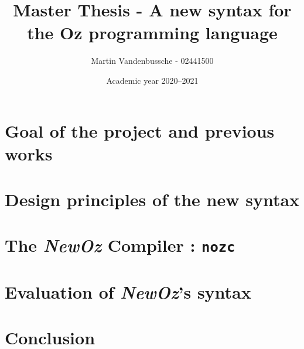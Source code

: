 \documentclass[a4paper,11pt]{scrreprt}
\title{Master Thesis - A new syntax for the Oz programming language}
\author{Martin Vandenbussche - 02441500}
\date{Academic year 2020--2021}
\begin{document}
\maketitle



\begin{comment}
Section 1.1 Contexte et problème
Section 1.2: Inspirations
1.2.1: Scala
1.2.2 Ozma
1.2.3 Jean-Pacifique
Section 1.3 Contributions
1.3.1 Adaptation du travail Jean-Pacifique
1.3.2 NewOz compiler
1.3.3 Community feedback
Section 1.4 Final conclusion on new syntax

chap 2 -> Design principles + my april syntax

chap 3 -> nozc compiler

chap 4 -> community feedback
Comprend  une conclusion qui donne une syntaxe newOz finale avec ton expérience y compris feedback de la communauté

chap 5 -> résumé du processus complet

Appendices : grammar, translations exmaples of Oz to NewOz, tutorial/doc from GitHub
\end{comment}

\tableofcontents


\chapter{Goal of the project and previous works}\label{ch:1}


\chapter{Design principles of the new syntax}\label{ch:2}


\chapter{The \textit{NewOz} Compiler : \texttt{nozc}}\label{ch:3}


\chapter{Evaluation of \textit{NewOz}'s syntax}\label{ch:4}


\chapter{Conclusion}\label{ch:5}

\end{document}
